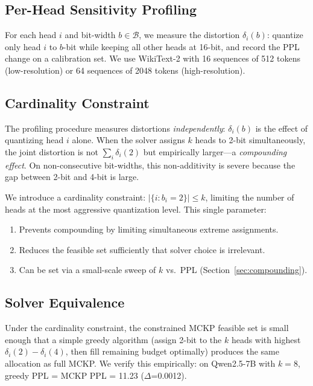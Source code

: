 \documentclass[11pt,a4paper]{article}
\begin{document}
\subsection{Per-Head Sensitivity Profiling}

For each head $i$ and bit-width $b \in \mathcal{B}$, we measure the distortion $\delta_i(b)$: quantize only head $i$ to $b$-bit while keeping all other heads at 16-bit, and record the PPL change on a calibration set.
We use WikiText-2 with 16 sequences of 512 tokens (low-resolution) or 64 sequences of 2048 tokens (high-resolution).

\subsection{Cardinality Constraint}

The profiling procedure measures distortions \emph{independently}: $\delta_i(b)$ is the effect of quantizing head $i$ alone. When the solver assigns $k$ heads to 2-bit simultaneously, the joint distortion is not $\sum_i \delta_i(2)$ but empirically larger---a \emph{compounding effect}. On non-consecutive bit-widths, this non-additivity is severe because the gap between 2-bit and 4-bit is large.

We introduce a cardinality constraint: $|\{i : b_i = 2\}| \leq k$, limiting the number of heads at the most aggressive quantization level. This single parameter:
\begin{enumerate}
\item Prevents compounding by limiting simultaneous extreme assignments.
\item Reduces the feasible set sufficiently that solver choice is irrelevant.
\item Can be set via a small-scale sweep of $k$ vs.\ PPL (Section~\ref{sec:compounding}).
\end{enumerate}

\subsection{Solver Equivalence}

Under the cardinality constraint, the constrained MCKP feasible set is small enough that a simple greedy algorithm (assign 2-bit to the $k$ heads with highest $\delta_i(2) - \delta_i(4)$, then fill remaining budget optimally) produces the same allocation as full MCKP. We verify this empirically: on Qwen2.5-7B with $k{=}8$, greedy PPL = MCKP PPL = 11.23 ($\Delta$=0.0012).
\end{document}
